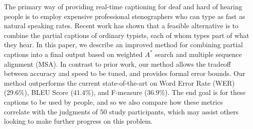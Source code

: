 The primary way of providing real-time captioning for deaf and hard of hearing people is to employ expensive professional stenographers who can type as fast
 as natural speaking rates. Recent work has shown that a feasible alternative is
 to combine the partial captions of ordinary typists, each of whom types part of
 what they hear. In this paper, we describe an improved method for combining
 partial captions into a final output based on weighted $A^*$ search and multiple
 sequence alignment (MSA). In contrast to prior work, our method allows the
 tradeoff between accuracy and speed to be tuned, and provides formal error
 bounds. Our method outperforms the current state-of-the-art on Word Error Rate
 (WER) (29.6\%), BLEU Score (41.4\%), and F-measure (36.9\%). The end goal is for
 these captions to be used by people, and so we also compare how these metrics
 correlate with the judgments of 50 study participants, which may assist others
 looking to make further progress on this problem.

